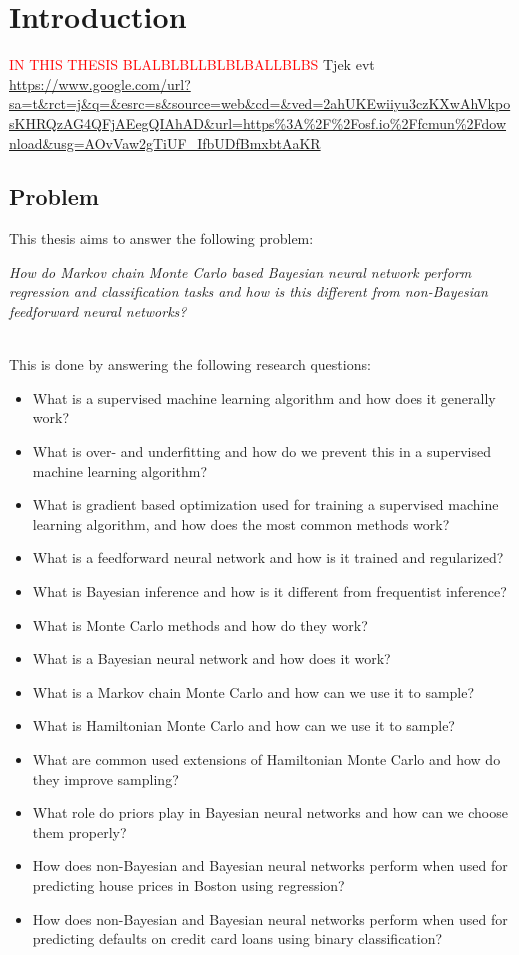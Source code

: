 \chapter{Introduction}
\textcolor{red}{IN THIS THESIS BLALBLBLLBLBLBALLBLBS}
Tjek evt
\url{https://www.google.com/url?sa=t&rct=j&q=&esrc=s&source=web&cd=&ved=2ahUKEwiiyu3czKXwAhVkposKHRQzAG4QFjAEegQIAhAD&url=https%3A%2F%2Fosf.io%2Ffcmun%2Fdownload&usg=AOvVaw2gTiUF_IfbUDfBmxbtAaKR}

\clearpage
\section{Problem} \label{sec:problem}
This thesis aims to answer the following problem:
\begin{center}
    \textit{How do Markov chain Monte Carlo based Bayesian neural network perform regression and classification tasks and how is this different from non-Bayesian feedforward neural networks?}
\end{center}
\noindent
\\
This is done by answering the following research questions:
\begin{itemize}
    \item What is a supervised machine learning algorithm and how does it generally work?
    \item What is over- and underfitting and how do we prevent this in a supervised machine learning algorithm?
    \item What is gradient based optimization used for training a supervised machine learning algorithm, and how does the most common methods work?
    \item What is a feedforward neural network and how is it trained and regularized?
    \item What is Bayesian inference and how is it different from frequentist inference?
    \item What is Monte Carlo methods and how do they work?
    \item What is a Bayesian neural network and how does it work?
    \item What is a Markov chain Monte Carlo and how can we use it to sample?
    \item What is Hamiltonian Monte Carlo and how can we use it to sample?
    \item What are common used extensions of Hamiltonian Monte Carlo and how do they improve sampling?
    \item What role do priors play in Bayesian neural networks and how can we choose them properly? 
    \item How does non-Bayesian and Bayesian neural networks perform when used for predicting house prices in Boston using regression?
    \item How does non-Bayesian and Bayesian neural networks perform when used for predicting defaults on credit card loans using binary classification?
\end{itemize}
\clearpage

